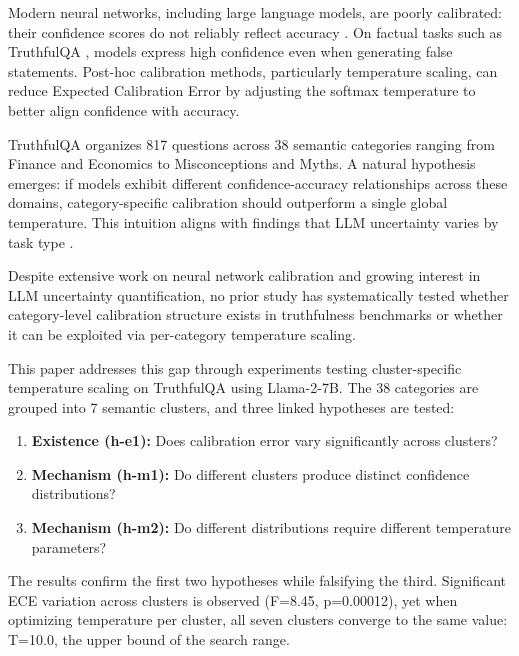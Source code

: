 
Modern neural networks, including large language models, are poorly calibrated: their confidence scores do not reliably reflect accuracy \citep{guo2017calibration}. On factual tasks such as TruthfulQA \citep{lin2022truthfulqa}, models express high confidence even when generating false statements. Post-hoc calibration methods, particularly temperature scaling, can reduce Expected Calibration Error by adjusting the softmax temperature to better align confidence with accuracy.

TruthfulQA organizes 817 questions across 38 semantic categories ranging from Finance and Economics to Misconceptions and Myths. A natural hypothesis emerges: if models exhibit different confidence-accuracy relationships across these domains, category-specific calibration should outperform a single global temperature. This intuition aligns with findings that LLM uncertainty varies by task type \citep{xiong2023uncertainty}.

Despite extensive work on neural network calibration and growing interest in LLM uncertainty quantification, no prior study has systematically tested whether category-level calibration structure exists in truthfulness benchmarks or whether it can be exploited via per-category temperature scaling.

This paper addresses this gap through experiments testing cluster-specific temperature scaling on TruthfulQA using Llama-2-7B. The 38 categories are grouped into 7 semantic clusters, and three linked hypotheses are tested:

\begin{enumerate}
\item \textbf{Existence (h-e1):} Does calibration error vary significantly across clusters?
\item \textbf{Mechanism (h-m1):} Do different clusters produce distinct confidence distributions?
\item \textbf{Mechanism (h-m2):} Do different distributions require different temperature parameters?
\end{enumerate}

The results confirm the first two hypotheses while falsifying the third. Significant ECE variation across clusters is observed (F=8.45, p=0.00012), yet when optimizing temperature per cluster, all seven clusters converge to the same value: T=10.0, the upper bound of the search range.

